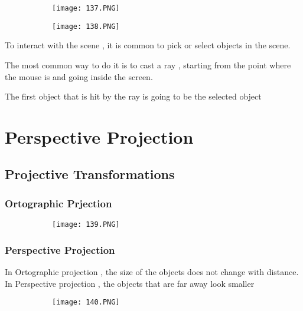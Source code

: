\documentclass{article}
\begin{document}
\begin{figure}[ht!]
  \centering
  \begin{subfigure}[b]{0.49\linewidth}
    \texttt{[image: 137.PNG]}
  \end{subfigure}
  \begin{subfigure}[b]{0.49\textwidth}
         \centering
         \texttt{[image: 138.PNG]}
     \end{subfigure}
\end{figure}

To interact with the scene , it is common to pick or select objects in the scene.

The most common way to do it is to cast a ray , starting from the point where the mouse is and going inside the screen.

The first object that is hit by the ray is going to be the selected object


\section{Perspective Projection}
\subsection{Projective Transformations}

\vspace{20mm}
\subsubsection{Ortographic Prjection}


\begin{figure}[ht!]
  \centering
  \begin{subfigure}[b]{0.7\linewidth}
    \texttt{[image: 139.PNG]}
  \end{subfigure}
\end{figure}


\subsubsection{Perspective Projection}

In Ortographic projection , the size of the objects does not change with distance.
In Perspective projection , the objects that are far away look smaller 

\begin{figure}[ht!]
  \centering
  \begin{subfigure}[b]{0.5\linewidth}
    \texttt{[image: 140.PNG]}
  \end{subfigure}
\end{figure}
\end{document}
